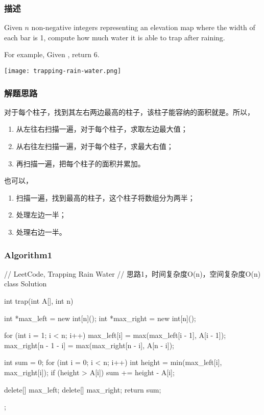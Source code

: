 \subsubsection{描述}
Given $n$ non-negative integers representing an elevation map where the width 
of each bar is 1, compute how much water it is able to trap after raining.

For example, 
Given \code{[0,1,0,2,1,0,1,3,2,1,2,1]}, return 6.

\begin{center}
	\texttt{[image: trapping-rain-water.png]}\\
	\label{fig:trapping-rain-water}
\end{center}


\subsubsection{解题思路}
对于每个柱子，找到其左右两边最高的柱子，该柱子能容纳的面积就是。所以，
\begin{enumerate}
	\item 从左往右扫描一遍，对于每个柱子，求取左边最大值；
	\item 从右往左扫描一遍，对于每个柱子，求最大右值；
	\item 再扫描一遍，把每个柱子的面积并累加。
\end{enumerate}

也可以，
\begin{enumerate}
	\item 扫描一遍，找到最高的柱子，这个柱子将数组分为两半；
	\item 处理左边一半；
	\item 处理右边一半。
\end{enumerate}


\subsubsection{Algorithm1}
\begin{Code}
	// LeetCode, Trapping Rain Water
	// 思路1，时间复杂度O(n)，空间复杂度O(n)
	class Solution {
		int trap(int A[], int n) {
			int *max_left = new int[n]();
			int *max_right = new int[n]();
			
			for (int i = 1; i < n; i++) {
				max_left[i] = max(max_left[i - 1], A[i - 1]);
				max_right[n - 1 - i] = max(max_right[n - i], A[n - i]);
			}
			
			int sum = 0;
			for (int i = 0; i < n; i++) {
				int height = min(max_left[i], max_right[i]);
				if (height > A[i])
					sum += height - A[i];
			}
			
			delete[] max_left;
			delete[] max_right;
			return sum;
		}
	};
\end{Code}


